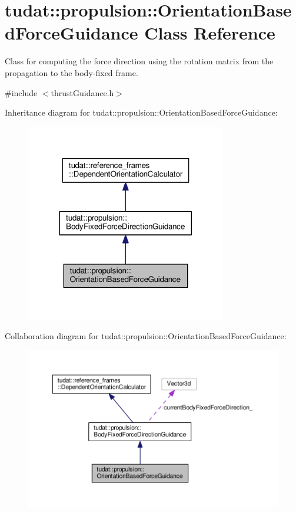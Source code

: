 \hypertarget{classtudat_1_1propulsion_1_1OrientationBasedForceGuidance}{}\section{tudat\+:\+:propulsion\+:\+:Orientation\+Based\+Force\+Guidance Class Reference}
\label{classtudat_1_1propulsion_1_1OrientationBasedForceGuidance}


Class for computing the force direction using the rotation matrix from the propagation to the body-\/fixed frame.  




{\ttfamily \#include $<$thrust\+Guidance.\+h$>$}



Inheritance diagram for tudat\+:\+:propulsion\+:\+:Orientation\+Based\+Force\+Guidance\+:
\nopagebreak
\begin{figure}[H]
\begin{center}
\leavevmode
\includegraphics[width=248pt]{classtudat_1_1propulsion_1_1OrientationBasedForceGuidance__inherit__graph}
\end{center}
\end{figure}


Collaboration diagram for tudat\+:\+:propulsion\+:\+:Orientation\+Based\+Force\+Guidance\+:
\nopagebreak
\begin{figure}[H]
\begin{center}
\leavevmode
\includegraphics[width=350pt]{classtudat_1_1propulsion_1_1OrientationBasedForceGuidance__coll__graph}
\end{center}
\end{figure}
